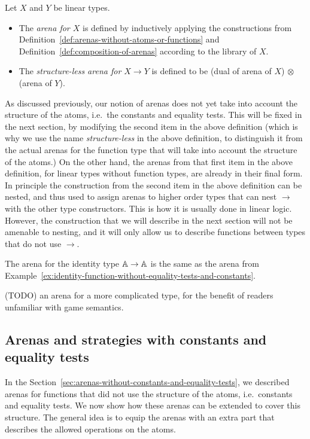 \begin{definition} Let $X$ and $Y$ be linear types.
    \begin{itemize}
        \item The \emph{arena for  $X$} is defined by inductively applying the constructions from Definition~\ref{def:arenas-without-atoms-or-functions} and Definition~\ref{def:composition-of-arenas} according to the library of $X$.
        \item The \emph{structure-less arena for $X \to Y$} is defined to be (dual of arena of $X$) $\otimes$ (arena of $Y$).
    \end{itemize}
\end{definition}

As discussed previously, our notion of arenas does not yet take into account the structure of the atoms, i.e.~the constants and equality tests. This will be fixed in the next section, by modifying the second item in the above definition (which is why we use the name \emph{structure-less} in the above definition, to distinguish it from the actual arenas for the function type that will take into account the structure of the atoms.)   On the other hand, the arenas from that first item in the above definition, for linear types without function types, are already in their final form. In principle the construction from the second item in the above definition can be nested, and thus used to assign arenas to higher order types that can nest $\to$ with the other type constructors. This is how it is usually done in linear logic. However,  the construction that we will describe in the next section will not be amenable to nesting, and it will only allow us to describe functions between types that do not use $\to$.


 

\begin{example}
    The arena for the identity type $\mathbb A \to \mathbb A$ is the same as the arena from Example~\ref{ex:identity-function-without-equality-tests-and-constants}.
\end{example}

\begin{example}
    (TODO) an arena for a more complicated type, for the benefit of readers unfamiliar with game semantics.
\end{example}




\subsection{Arenas and strategies with constants and equality tests}
\label{sec:arenas-with-constants-and-equality-tests}
In the Section~\ref{sec:arenas-without-constants-and-equality-tests}, we described arenas for functions that did not use the structure of the atoms, i.e.~constants and equality tests. We now show how these arenas can be extended to cover this structure. The general idea is to equip the arenas with an extra part that describes the allowed operations on the atoms. 



